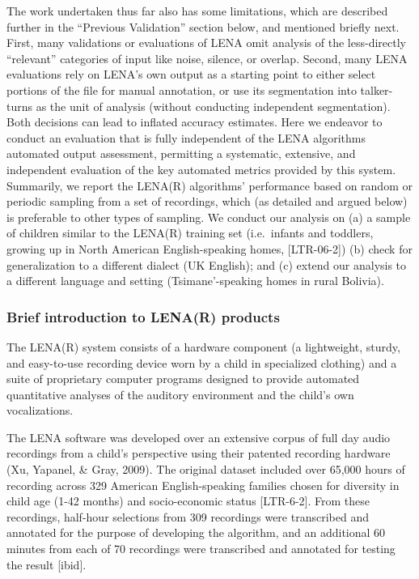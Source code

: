 \documentclass[english,floatsintext,man]{apa6}
\begin{document}
The work undertaken thus far also has some limitations, which are
described further in the \enquote{Previous Validation} section below,
and mentioned briefly next. First, many validations or evaluations of
LENA omit analysis of the less-directly \enquote{relevant} categories of
input like noise, silence, or overlap. Second, many LENA evaluations
rely on LENA's own output as a starting point to either select portions
of the file for manual annotation, or use its segmentation into
talker-turns as the unit of analysis (without conducting independent
segmentation). Both decisions can lead to inflated accuracy estimates.
Here we endeavor to conduct an evaluation that is fully independent of
the LENA algorithms automated output assessment, permitting a
systematic, extensive, and independent evaluation of the key automated
metrics provided by this system. Summarily, we report the LENA(R)
algorithms' performance based on random or periodic sampling from a set
of recordings, which (as detailed and argued below) is preferable to
other types of sampling. We conduct our analysis on (a) a sample of
children similar to the LENA(R) training set (i.e.~infants and toddlers,
growing up in North American English-speaking homes, {[}LTR-06-2{]}) (b)
check for generalization to a different dialect (UK English); and (c)
extend our analysis to a different language and setting
(Tsimane'-speaking homes in rural Bolivia).

\subsubsection{Brief introduction to LENA(R)
products}\label{brief-introduction-to-lenar-products}

The LENA(R) system consists of a hardware component (a lightweight,
sturdy, and easy-to-use recording device worn by a child in specialized
clothing) and a suite of proprietary computer programs designed to
provide automated quantitative analyses of the auditory environment and
the child's own vocalizations.

The LENA software was developed over an extensive corpus of full day
audio recordings from a child's perspective using their patented
recording hardware (Xu, Yapanel, \& Gray, 2009). The original dataset
included over 65,000 hours of recording across 329 American
English-speaking families chosen for diversity in child age (1-42
months) and socio-economic status {[}LTR-6-2{]}. From these recordings,
half-hour selections from 309 recordings were transcribed and annotated
for the purpose of developing the algorithm, and an additional 60
minutes from each of 70 recordings were transcribed and annotated for
testing the result {[}ibid{]}.
\end{document}

